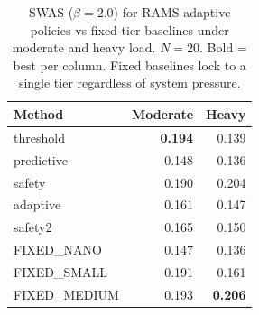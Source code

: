 \begin{table}[t]
\centering
\caption{SWAS ($\beta=2.0$) for RAMS adaptive policies vs fixed-tier baselines under moderate and heavy load. $N=20$. Bold = best per column. Fixed baselines lock to a single tier regardless of system pressure.}
\label{tab:exp7d_baselines}
\begin{tabular}{lrr}
\toprule
Method & Moderate & Heavy \\
\midrule
  threshold & \textbf{0.194} & 0.139 \\
  predictive & 0.148 & 0.136 \\
  safety & 0.190 & 0.204 \\
  adaptive & 0.161 & 0.147 \\
  safety2 & 0.165 & 0.150 \\
\midrule
  FIXED_NANO & 0.147 & 0.136 \\
  FIXED_SMALL & 0.191 & 0.161 \\
  FIXED_MEDIUM & 0.193 & \textbf{0.206} \\
\bottomrule
\end{tabular}
\end{table}